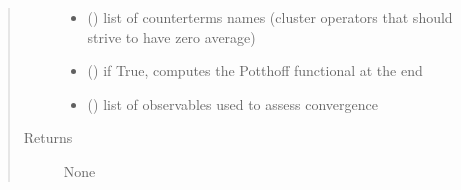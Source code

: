 \documentclass[letterpaper,10pt,english]{sphinxmanual}
\begin{document}
\begin{fulllineitems}
\begin{quote}
\begin{description}
\begin{itemize}
\item {} 
\sphinxAtStartPar
{} (\sphinxstyleliteralemphasis{\sphinxupquote{{[}}}\sphinxstyleliteralemphasis{\sphinxupquote{{]}}}) \textendash{} list of counterterms names (cluster operators that should strive to have zero average)

\item {} 
\sphinxAtStartPar
{} () \textendash{} if True, computes the Potthoff functional at the end

\item {} 
\sphinxAtStartPar
{}\sphinxstyleliteralstrong{\sphinxupquote{{]}}} (\sphinxstyleliteralemphasis{\sphinxupquote{{[}}}) \textendash{} list of observables used to assess convergence

\end{itemize}

\item[{Returns}] \leavevmode
\sphinxAtStartPar
None

\end{description}\end{quote}

\end{fulllineitems}

\end{document}
